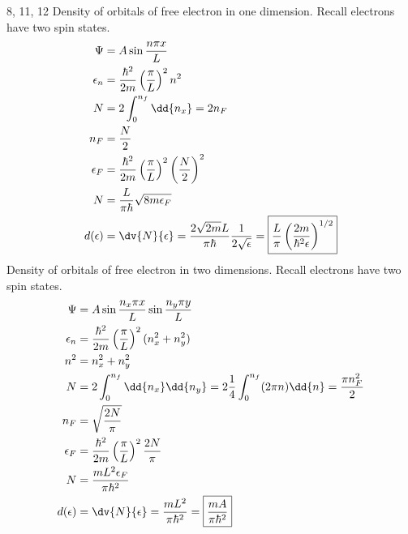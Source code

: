 \documentclass[newpage]{homework}
\begin{document}
\maketitle

8, 11, 12
\question
Density of orbitals of free electron in one dimension. Recall electrons have two spin states.
\begin{align*}
    \Psi        &=	A\sin{\frac{n\pi x}{L}}	\\
    \epsilon_n  &=  \frac{\hbar^2}{2m} \left(\frac{\pi}{L}\right)^2 n^2 \\
    N   &=  2 \int_{0}^{n_f} \dd{n_x}
        =	2n_F	\\
    n_F &=  \frac{N}{2} \\
    \epsilon_F  &=	\frac{\hbar^2}{2m} \left(\frac{\pi}{L}\right)^2 \left(\frac{N}{2}\right)^2	\\
    N    &= \frac{L}{\pi\hbar} \sqrt{8m \epsilon_F} \\
    d(\epsilon) &=  \dv{N}{\epsilon}  
                =  \frac{2\sqrt{2m} L}{\pi\hbar} \frac{1}{2\sqrt{\epsilon}} 
                =  \boxed{\frac{L}{\pi} \left(\frac{2m}{\hbar^2 \epsilon}\right)^{1/2}}
\end{align*}
Density of orbitals of free electron in two dimensions. Recall electrons have two spin states.
\begin{align*}
    \Psi        &=	A\sin{\frac{n_x \pi x}{L}}\sin{\frac{n_y \pi y}{L}}	\\
    \epsilon_n  &=  \frac{\hbar^2}{2m} \left(\frac{\pi}{L}\right)^2 (n_x^2 + n_y^2) \\
    n^2    &=	n_x^2 + n_y^2	\\
    N   &=  2 \int_{0}^{n_f} \dd{n_x} \dd{n_y}
        =  2 \frac{1}{4}\int_{0}^{n_f} (2 \pi n) \dd{n}
        =  \frac{\pi n_F^2}{2} \\
    n_F    &=	\sqrt{\frac{2N}{\pi}}	\\
    \epsilon_F  &=	\frac{\hbar^2}{2m} \left(\frac{\pi}{L}\right)^2 \frac{2N}{\pi}	\\
    N    &= \frac{mL^2 \epsilon_F}{\pi\hbar^2} \\
    d(\epsilon) &=  \dv{N}{\epsilon}  
                =  \frac{mL^2}{\pi\hbar^2}
                =  \boxed{\frac{mA}{\pi\hbar^2}}
\end{align*}
\end{document}
